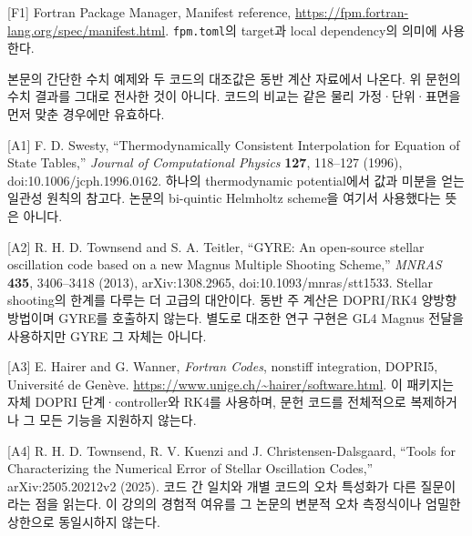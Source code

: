 \documentclass[
  10pt,
  a4paper,
]{article}
\begin{document}
{[}F1{]} Fortran Package Manager, Manifest reference,
\url{https://fpm.fortran-lang.org/spec/manifest.html}.
\texttt{fpm.toml}의 target과 local dependency의 의미에 사용한다.

본문의 간단한 수치 예제와 두 코드의 대조값은 동반 계산 자료에서 나온다.
위 문헌의 수치 결과를 그대로 전사한 것이 아니다. 코드의 비교는 같은 물리
가정·단위·표면을 먼저 맞춘 경우에만 유효하다.

{[}A1{]} F. D. Swesty, ``Thermodynamically Consistent Interpolation for
Equation of State Tables,'' \emph{Journal of Computational Physics}
\textbf{127}, 118--127 (1996), doi:10.1006/jcph.1996.0162. 하나의
thermodynamic potential에서 값과 미분을 얻는 일관성 원칙의 참고다.
논문의 bi-quintic Helmholtz scheme을 여기서 사용했다는 뜻은 아니다.

{[}A2{]} R. H. D. Townsend and S. A. Teitler, ``GYRE: An open-source
stellar oscillation code based on a new Magnus Multiple Shooting
Scheme,'' \emph{MNRAS} \textbf{435}, 3406--3418 (2013), arXiv:1308.2965,
doi:10.1093/mnras/stt1533. Stellar shooting의 한계를 다루는 더 고급의
대안이다. 동반 주 계산은 DOPRI/RK4 양방향 방법이며 GYRE를 호출하지
않는다. 별도로 대조한 연구 구현은 GL4 Magnus 전달을 사용하지만 GYRE 그
자체는 아니다.

{[}A3{]} E. Hairer and G. Wanner, \emph{Fortran Codes}, nonstiff
integration, DOPRI5, Université de Genève.
\url{https://www.unige.ch/~hairer/software.html}. 이 패키지는 자체 DOPRI
단계·controller와 RK4를 사용하며, 문헌 코드를 전체적으로 복제하거나 그
모든 기능을 지원하지 않는다.

{[}A4{]} R. H. D. Townsend, R. V. Kuenzi and J. Christensen-Dalsgaard,
``Tools for Characterizing the Numerical Error of Stellar Oscillation
Codes,'' arXiv:2505.20212v2 (2025). 코드 간 일치와 개별 코드의 오차
특성화가 다른 질문이라는 점을 읽는다. 이 강의의 경험적 여유를 그 논문의
변분적 오차 측정식이나 엄밀한 상한으로 동일시하지 않는다.

\endgroup
\end{document}
